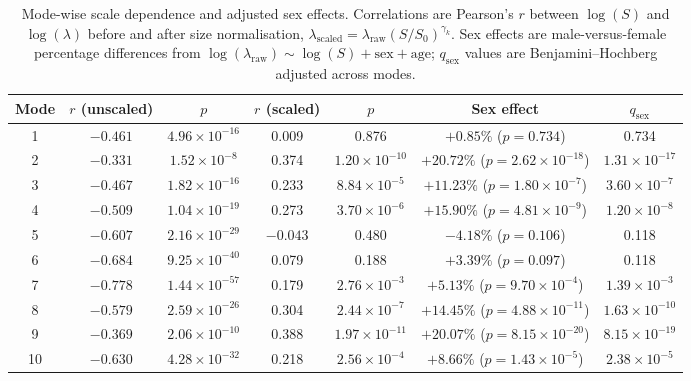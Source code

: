 \documentclass[openacc]{rsproca_new}
\begin{document}
\begin{table}[p]
\centering
\caption{Mode-wise scale dependence and adjusted sex effects. Correlations are Pearson's $r$ between $\log(S)$ and $\log(\lambda)$ before and after size normalisation, $\lambda_{\mathrm{scaled}}=\lambda_{\mathrm{raw}}(S/S_0)^{\gamma_k}$. Sex effects are male-versus-female percentage differences from $\log(\lambda_{\mathrm{raw}})\sim\log(S)+\mathrm{sex}+\mathrm{age}$; $q_{\mathrm{sex}}$ values are Benjamini--Hochberg adjusted across modes.}

\label{tab:modes}
\scriptsize
\setlength{\tabcolsep}{3pt}
\begin{tabular}{ccccccc}
\toprule
Mode & $r$ (unscaled) & $p$ & $r$ (scaled) & $p$ & Sex effect & $q_{\mathrm{sex}}$ \\
\midrule
1  & $-0.461$ & $4.96 \times 10^{-16}$ & 0.009 & 0.876 & $+0.85\%$ ($p=0.734$) & 0.734 \\
2  & $-0.331$ & $1.52 \times 10^{-8}$  & 0.374 & $1.20 \times 10^{-10}$ & $+20.72\%$ ($p=2.62 \times 10^{-18}$) & $1.31 \times 10^{-17}$ \\
3  & $-0.467$ & $1.82 \times 10^{-16}$ & 0.233 & $8.84 \times 10^{-5}$  & $+11.23\%$ ($p=1.80 \times 10^{-7}$) & $3.60 \times 10^{-7}$ \\
4  & $-0.509$ & $1.04 \times 10^{-19}$ & 0.273 & $3.70 \times 10^{-6}$  & $+15.90\%$ ($p=4.81 \times 10^{-9}$) & $1.20 \times 10^{-8}$ \\
5  & $-0.607$ & $2.16 \times 10^{-29}$ & $-0.043$ & 0.480 & $-4.18\%$ ($p=0.106$) & 0.118 \\
6  & $-0.684$ & $9.25 \times 10^{-40}$ & 0.079 & 0.188 & $+3.39\%$ ($p=0.097$) & 0.118 \\
7  & $-0.778$ & $1.44 \times 10^{-57}$ & 0.179 & $2.76 \times 10^{-3}$  & $+5.13\%$ ($p=9.70 \times 10^{-4}$) & $1.39 \times 10^{-3}$ \\
8  & $-0.579$ & $2.59 \times 10^{-26}$ & 0.304 & $2.44 \times 10^{-7}$  & $+14.45\%$ ($p=4.88 \times 10^{-11}$) & $1.63 \times 10^{-10}$ \\
9  & $-0.369$ & $2.06 \times 10^{-10}$ & 0.388 & $1.97 \times 10^{-11}$ & $+20.07\%$ ($p=8.15 \times 10^{-20}$) & $8.15 \times 10^{-19}$ \\
10 & $-0.630$ & $4.28 \times 10^{-32}$ & 0.218 & $2.56 \times 10^{-4}$  & $+8.66\%$ ($p=1.43 \times 10^{-5}$) & $2.38 \times 10^{-5}$ \\
\bottomrule
\end{tabular}
\end{table}
\end{document}
